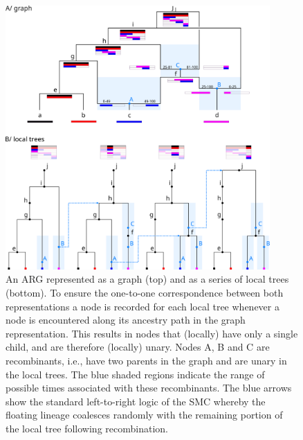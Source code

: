 \documentclass{article}
\begin{document}
\begin{figure}
\centering
\includegraphics[width=0.9\textwidth]{figures/smc_custom_2rows_area_full_hap.png}
\caption{An ARG represented as a graph (top) and as a
series of local trees (bottom). To ensure the one-to-one correspondence
between both representations a node is recorded for each local tree whenever
a node is encountered along its ancestry path in the graph representation.
This results in nodes that (locally) have only a single child, and are therefore
(locally) unary.
Nodes A, B and C are recombinants, i.e., have two parents in the graph
and are unary in the local trees. The blue shaded regions indicate
the range of possible times associated with these recombinants.
The blue arrows show the
standard left-to-right logic of the SMC whereby
the floating lineage coalesces randomly
    with the remaining portion of the local tree following recombination.
}
\label{fig:smc-unary}
\end{figure}
\end{document}
